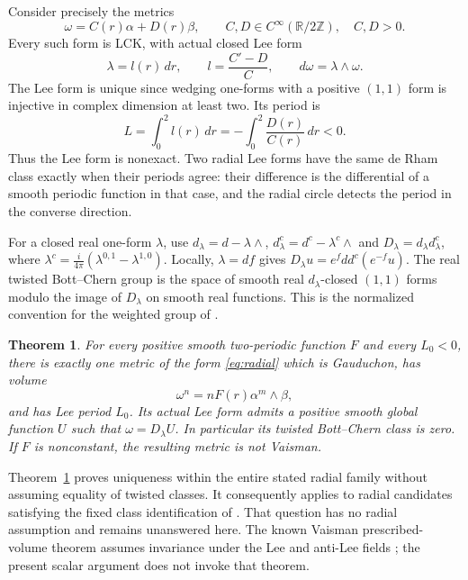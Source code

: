 \documentclass[11pt]{article}
\newcommand{\ddc}{dd^c}
\newtheorem{theorem}{Theorem}
\theoremstyle{remark}\newtheorem{remark}[theorem]{Remark}
\begin{document}
Consider precisely the metrics
\begin{equation}\label{eq:radial}
 \omega=C(r)\alpha+D(r)\beta,
 \qquad C,D\in C^\infty(\mathbb R/2\mathbb Z),\quad C,D>0.
\end{equation}
Every such form is LCK, with actual closed Lee form
\begin{equation}\label{eq:lee}
 \lambda=l(r)\,dr,\qquad l=\frac{C'-D}{C},
 \qquad d\omega=\lambda\wedge\omega.
\end{equation}
The Lee form is unique since wedging one-forms with a positive
$(1,1)$ form is injective in complex dimension at least two.
Its period is
\begin{equation}\label{eq:period}
 L=\int_0^2l(r)\,dr=-\int_0^2\frac{D(r)}{C(r)}\,dr<0.
\end{equation}
Thus the Lee form is nonexact. Two radial Lee forms have the same
de Rham class exactly when their periods agree: their difference is
the differential of a smooth periodic function in that case, and the
radial circle detects the period in the converse direction.

For a closed real one-form $\lambda$, use
$d_\lambda=d-\lambda\wedge$,
$d_\lambda^c=d^c-\lambda^c\wedge$ and
$D_\lambda=d_\lambda d_\lambda^c$, where
$\lambda^c=\frac{i}{4\pi}(\lambda^{0,1}-\lambda^{1,0})$.
Locally, $\lambda=df$ gives
$D_\lambda u=e^f\ddc(e^{-f}u)$.
The real twisted Bott--Chern group is the space of smooth real
$d_\lambda$-closed $(1,1)$ forms modulo the image of $D_\lambda$
on smooth real functions. This is the normalized convention for the
weighted group of \cite[Definition 18.34]{OVbook}.

\begin{theorem}\label{thm:main}
For every positive smooth two-periodic function $F$ and every
$L_0<0$, there is exactly one metric of the form \eqref{eq:radial}
which is Gauduchon, has volume
\[
 \omega^n=nF(r)\alpha^m\wedge\beta,
\]
and has Lee period $L_0$. Its actual Lee form admits a positive
smooth global function $U$ such that $\omega=D_\lambda U$.
In particular its twisted Bott--Chern class is zero. If $F$ is
nonconstant, the resulting metric is not Vaisman.
\end{theorem}

Theorem~\ref{thm:main} proves uniqueness within the entire stated
radial family without assuming equality of twisted classes.
It consequently applies to radial candidates satisfying the fixed
class identification of \cite[Question 47.56(3)]{OVbook}.
That question has no radial assumption and remains unanswered here.
The known Vaisman prescribed-volume theorem assumes invariance
under the Lee and anti-Lee fields \cite[Theorem 4.1]{OV24}; the
present scalar argument does not invoke that theorem.
\end{document}

